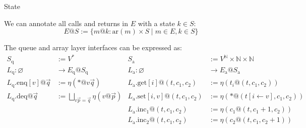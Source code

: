 \documentclass{beamer}
\newcommand{\kw}[1]{\ensuremath{ \mathrm{#1} }}
\begin{document}
\begin{frame}{State} %
  \begin{definition}
    We can annotate all calls and returns in $E$ with a state $k \in S$:
    \[
      E@S :=
        \{ m@k : \kw{ar}(m) \times S \mid
           m \in E, k \in S \}
    \]
  \end{definition}
  \pause
  \begin{example}
    The queue and array layer interfaces can be expressed as:
    \small
    \begin{align*}
      S_\kw{q} &:= V^* &
      S_\kw{a} &:= V^\mathbb{N} \times \mathbb{N} \times \mathbb{N}
      \\
      L_\kw{q} : \varnothing &\rightarrow E_\kw{q}@S_\kw{q} &
      L_\kw{a} : \varnothing &\rightarrow E_\kw{a}@S_\kw{a}
      \\
      L_\kw{q}.\kw{enq}[v]@\vec{q} &:= \eta(*@v\vec{q}) &
      L_\kw{a}.\kw{get}[i]@(t, c_1, c_2) &:= \eta(t_i@(t, c_1, c_2))
      \\
      L_\kw{q}.\kw{deq}@\vec{q} &:= \bigsqcup_{v\vec{p} = \vec{q}} \eta(v@\vec{p}) &
      L_\kw{a}.\kw{set}[i, v]@(t, c_1, c_2) &:= \eta(*@(t[i \leftarrow v], c_1, c_2))
      \\
      & &
      L_\kw{a}.\kw{inc}_1@(t, c_1, c_2) &:= \eta(c_1@(t, c_1 + 1, c_2))
      \\
      & &
      L_\kw{a}.\kw{inc}_2@(t, c_1, c_2) &:= \eta(c_2@(t, c_1, c_2 + 1))
    \end{align*}
  \end{example}
\end{frame}
\end{document}
